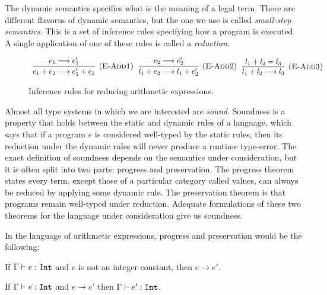 The dynamic semantics specifies what is the meaning of a legal term. There are different flavorus of dynamic semantics, but the one we use is called \textit{small-step semantics}. This is a set of inference rules specifying how a program is executed. A single application of one of these rules is called a \textit{reduction}.

\begin{figure}[h]

\noindent
{}

\[
\begin{array}{c}

\infer[\textsc{(E-Add1)}]
	{e_1 + e_2 \longrightarrow e_1' + e_2}
	{e_1 \longrightarrow e_1'}
~~
\infer[\textsc{(E-Add2)}]
	{l_1 + e_2 \longrightarrow l_1 + e_2'}
	{e_2 \longrightarrow e_2'}
~~
\infer[\textsc{(E-Add3)}]
	{l_1 + l_2 \longrightarrow l_3}
	{l_1 + l_2 = l_3}

\end{array}
\]


\vspace{-7pt}
\caption{Inference rules for reducing arithmetic expressions.}
\label{A sample. }
\end{figure}

Almost all type systems in which we are interested are \textit{sound}. Soundness is a property that holds between the static and dynamic rules of a language, which says that if a program $e$ is considered well-typed by the static rules, then its reduction under the dynamic rules will never produce a runtime type-error. The exact definition of soundness depends on the semantics under consideration, but it is often split into two parts: progress and preservation. The progress theorem states every term, except those of a particular category called values, can always be reduced by applying some dynamic rule. The preservation theorem is that programs remain well-typed under reduction. Adequate formulations of these two theorems for the language under consideration give us soundness.

In the language of arithmetic expressions, progress and preservation would be the following:

\begin{theorem}[Progress]
If $\Gamma \vdash e: \mathtt{Int}$ and $e$ is not an integer constant, then $e \rightarrow e'$.
\end{theorem}

\begin{theorem}[Preservation]
If $\Gamma \vdash e: \mathtt{Int}$ and $e \rightarrow e'$ then $\Gamma \vdash e': \mathtt{Int}$.
\end{theorem}

